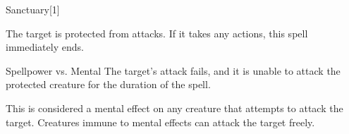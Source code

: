 \begin{spellsection}{Sanctuary}[1]
    \begin{spellheader}
    \end{spellheader}
    \begin{spellcontent}
        \begin{spelltargetinginfo}
        \end{spelltargetinginfo}
        \begin{spelleffects}
            \spelleffect The target is protected from attacks. If it takes any actions, this spell immediately ends.
            \spelldur \durshort
        \end{spelleffects}
    \end{spellcontent}
    \begin{spellsubcontent}
        \begin{spelltargetinginfo}
        \end{spelltargetinginfo}
        \begin{spelleffects}
            \begin{spellattack}{Spellpower vs. Mental}
                \spellsuccess The target's attack fails, and it is unable to attack the protected creature for the duration of the spell.
            \end{spellattack}
        \end{spelleffects}
    \end{spellsubcontent}
    \begin{spellfooter}
        \spellnotes This is considered a mental effect on any creature that attempts to attack the target. Creatures immune to mental effects can attack the target freely.
        \miscastexplode
    \end{spellfooter}
\end{spellsection}

